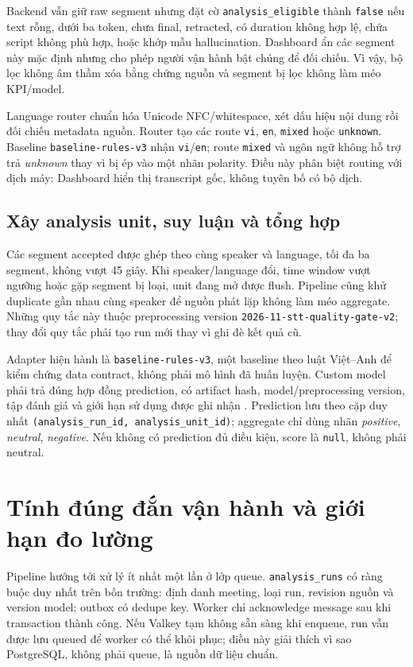 Backend vẫn giữ raw segment nhưng đặt cờ \texttt{analysis\_eligible} thành \texttt{false} nếu text rỗng, dưới ba token, chưa final, retracted, có duration không hợp lệ, chứa script không phù hợp, hoặc khớp mẫu hallucination. Dashboard ẩn các segment này mặc định nhưng cho phép người vận hành bật chúng để đối chiếu. Vì vậy, bộ lọc không âm thầm xóa bằng chứng nguồn và segment bị lọc không làm méo KPI/model.

Language router chuẩn hóa Unicode NFC/whitespace, xét dấu hiệu nội dung rồi đối chiếu metadata nguồn. Router tạo các route \texttt{vi}, \texttt{en}, \texttt{mixed} hoặc \texttt{unknown}. Baseline \texttt{baseline-rules-v3} nhận \texttt{vi}/\texttt{en}; route \texttt{mixed} và ngôn ngữ không hỗ trợ trả \textit{unknown} thay vì bị ép vào một nhãn polarity. Điều này phân biệt routing với dịch máy: Dashboard hiển thị transcript gốc, không tuyên bố có bộ dịch.

\subsection{Xây analysis unit, suy luận và tổng hợp}
Các segment accepted được ghép theo cùng speaker và language, tối đa ba segment, không vượt 45 giây. Khi speaker/language đổi, time window vượt ngưỡng hoặc gặp segment bị loại, unit đang mở được flush. Pipeline cũng khử duplicate gần nhau cùng speaker để nguồn phát lặp không làm méo aggregate. Những quy tắc này thuộc preprocessing version \texttt{2026-11-stt-quality-gate-v2}; thay đổi quy tắc phải tạo run mới thay vì ghi đè kết quả cũ.

Adapter hiện hành là \texttt{baseline-rules-v3}, một baseline theo luật Việt--Anh để kiểm chứng data contract, không phải mô hình đã huấn luyện. Custom model phải trả đúng hợp đồng prediction, có artifact hash, model/preprocessing version, tập đánh giá và giới hạn sử dụng được ghi nhận \cite{mitchell2019}. Prediction lưu theo cặp duy nhất \texttt{(analysis\_run\_id, analysis\_unit\_id)}; aggregate chỉ dùng nhãn \textit{positive}, \textit{neutral}, \textit{negative}. Nếu không có prediction đủ điều kiện, score là \texttt{null}, không phải neutral.

\section{Tính đúng đắn vận hành và giới hạn đo lường}
Pipeline hướng tới xử lý ít nhất một lần ở lớp queue. \texttt{analysis\_runs} có ràng buộc duy nhất trên bốn trường: định danh meeting, loại run, revision nguồn và version model; outbox có dedupe key. Worker chỉ acknowledge message sau khi transaction thành công. Nếu Valkey tạm không sẵn sàng khi enqueue, run vẫn được lưu queued để worker có thể khôi phục; điều này giải thích vì sao PostgreSQL, không phải queue, là nguồn dữ liệu chuẩn.

